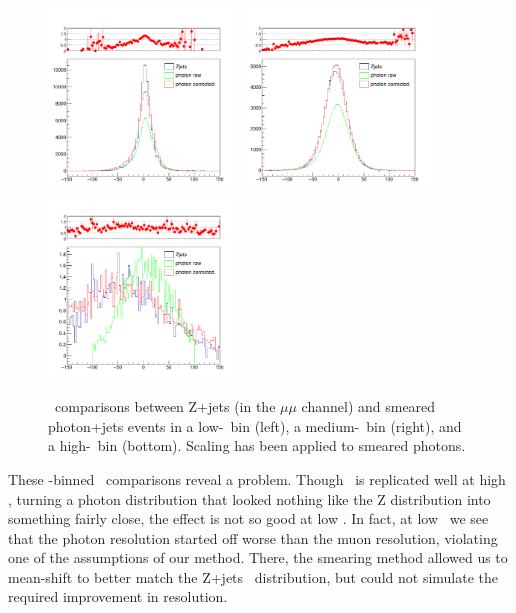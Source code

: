\begin{figure}[htbp]
    \centering
    \includegraphics[width=0.45\textwidth]{Images/SUSY/METl_bin_5.pdf}
    \includegraphics[width=0.45\textwidth]{Images/SUSY/METl_bin_16.pdf}
    \includegraphics[width=0.45\textwidth]{Images/SUSY/METl_bin_21.pdf}
    \caption{\METl\ comparisons between Z+jets (in the $\mu\mu$ channel) and smeared photon+jets events in a low-\pt\ bin (left), a medium-\pt\ bin (right), and a high-\pt\ bin (bottom). Scaling has been applied to smeared photons.}
    \label{fig:Z_photon_eta}
\end{figure}

These \pt-binned \METl\ comparisons reveal a problem. Though \METl\ is replicated well at high \pt, turning a photon distribution that looked nothing like the Z distribution into something fairly close, the effect is not so good at low \pt. In fact, at low \pt\ we see that the photon resolution started off worse than the muon resolution, violating one of the assumptions of our method. There, the smearing method allowed us to mean-shift to better match the Z+jets \METl\ distribution, but could not simulate the required improvement in resolution.

